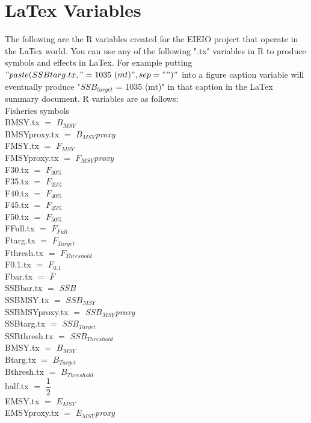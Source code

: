 \documentclass[]{report}
\begin{document}
\section*{LaTex Variables}
\raggedright
The following are the R variables created for the EIEIO project that operate in the LaTex world.  You can use any of the following ".tx" variables in R to produce symbols and effects in LaTex.  For example putting $"paste(SSBtarg.tx," = 1035\ (mt)",sep="")"$ into a figure caption variable will eventually produce "$SSB_{target}$ = 1035 (mt)" in that caption in the LaTex summary document.  R variables are as follows:\\  
\vspace{1cm}
  Fisheries symbols 
  \\ 
  BMSY.tx $=$ $B_{MSY}$ \\
  BMSYproxy.tx $=$ $B_{MSY}${}\textit{proxy} \\    
  FMSY.tx $=$ $F_{MSY}$ \\
  FMSYproxy.tx $=$ $F_{MSY}${}\textit{proxy} \\  
  F30.tx $=$ $F_{30\%}$ \\
  F35.tx $=$ $F_{35\%}$  \\
  F40.tx $=$ $F_{40\%}$  \\
  F45.tx $=$ $F_{45\%}$  \\
  F50.tx $=$ $F_{50\%}$    \\
  FFull.tx $=$ $F_{Full}$ \\
  Ftarg.tx $=$ $F_{Target}$ \\ 
  Fthresh.tx $=$ $F_{Threshold}$ \\ 
  F0.1.tx $=$ $F_{0.1}$    \\
  Fbar.tx $=$ $\bar{F}$   \\
  SSBbar.tx $=$ $\bar{SSB}$   \\ 
  SSBMSY.tx $=$ $SSB_{MSY}$ \\
  SSBMSYproxy.tx $=$ $SSB_{MSY}${}\textit{proxy} \\
  SSBtarg.tx $=$ $SSB_{Target}$\\  
  SSBthresh.tx $=$ $SSB_{Threshold}$\\ 
  BMSY.tx $=$ $B_{MSY}$ \\
  Btarg.tx $=$ $B_{Target}$\\  
  Bthresh.tx $=$ $B_{Threshold}$\\    
  half.tx $=$ $\dfrac{1}{2}$    \\
  EMSY.tx $=$ $E_{MSY}$ \\
  EMSYproxy.tx $=$ $E_{MSY}${}\textit{proxy} \\  
\end{document}

